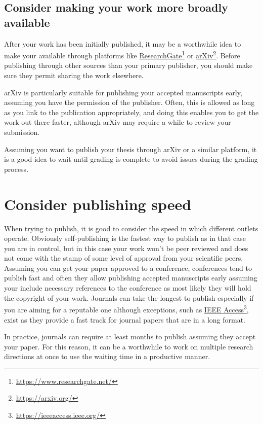 \subsection{Consider making your work more broadly available}

After your work has been initially published, it may be a worthwhile idea to make your available through platforms like \href{https://www.researchgate.net/}{Research\-Gate}\footnote{\url{https://www.researchgate.net/}} or \href{https://arxiv.org/}{arXiv}\footnote{\url{https://arxiv.org/}}.
Before publishing through other sources than your primary publisher, you should make sure they permit sharing the work elsewhere.

arXiv is particularly suitable for publishing your accepted manuscripts early, assuming you have the permission of the publisher.
Often, this is allowed as long as you link to the publication appropriately, and doing this enables you to get the work out there faster, although arXiv may require a while to review your submission.

Assuming you want to publish your thesis through arXiv or a similar platform, it is a good idea to wait until grading is complete to avoid issues during the grading process.

\section{Consider publishing speed}

When trying to publish, it is good to consider the speed in which different outlets operate.
Obviously self-publishing is the fastest way to publish as in that case you are in control, but in this case your work won't be peer reviewed and does not come with the stamp of some level of approval from your scientific peers.
Assuming you can get your paper approved to a conference, conferences tend to publish fast and often they allow publishing accepted manuscripts early assuming your include necessary references to the conference as most likely they will hold the copyright of your work.
Journals can take the longest to publish especially if you are aiming for a reputable one although exceptions, such as \href{https://ieeeaccess.ieee.org/}{IEEE Access}\footnote{\url{https://ieeeaccess.ieee.org/}}, exist as they provide a fast track for journal papers that are in a long format.

In practice, journals can require at least months to publish assuming they accept your paper.
For this reason, it can be a worthwhile to work on multiple research directions at once to use the waiting time in a productive manner.

